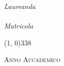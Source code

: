 \begin{titlepage}
\begin{center}
\begin{large}
            \begin{flushright}
                \textit{Laureanda}\\
                \vspace{5pt}
                \myName \\
                \vspace{5pt}
                \textit{Matricola} \myID
            \end{flushright}
        \end{large}

        \vspace{40pt}

        \line(1, 0){338} \\
        \begin{normalsize}
            \textsc{Anno Accademico \myAA}
        \end{normalsize}
    \end{center}
\end{titlepage}
